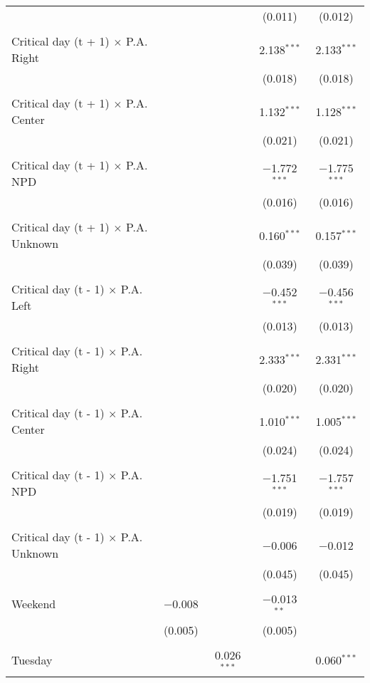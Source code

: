 \documentclass[
]{article}
\begin{document}
\begin{table}[!htbp]
{\begin{tabular}{@{\extracolsep{5pt}}lcccc}
  &  &  & (0.011) & (0.012) \\ 
  & & & & \\ 
 Critical day (t + 1) $\times$ P.A. Right &  &  & 2.138$^{***}$ & 2.133$^{***}$ \\ 
  &  &  & (0.018) & (0.018) \\ 
  & & & & \\ 
 Critical day (t + 1) $\times$ P.A. Center &  &  & 1.132$^{***}$ & 1.128$^{***}$ \\ 
  &  &  & (0.021) & (0.021) \\ 
  & & & & \\ 
 Critical day (t + 1) $\times$ P.A. NPD &  &  & $-$1.772$^{***}$ & $-$1.775$^{***}$ \\ 
  &  &  & (0.016) & (0.016) \\ 
  & & & & \\ 
 Critical day (t + 1) $\times$ P.A. Unknown &  &  & 0.160$^{***}$ & 0.157$^{***}$ \\ 
  &  &  & (0.039) & (0.039) \\ 
  & & & & \\ 
 Critical day (t - 1) $\times$ P.A. Left &  &  & $-$0.452$^{***}$ & $-$0.456$^{***}$ \\ 
  &  &  & (0.013) & (0.013) \\ 
  & & & & \\ 
 Critical day (t - 1) $\times$ P.A. Right &  &  & 2.333$^{***}$ & 2.331$^{***}$ \\ 
  &  &  & (0.020) & (0.020) \\ 
  & & & & \\ 
 Critical day (t - 1) $\times$ P.A. Center &  &  & 1.010$^{***}$ & 1.005$^{***}$ \\ 
  &  &  & (0.024) & (0.024) \\ 
  & & & & \\ 
 Critical day (t - 1) $\times$ P.A. NPD &  &  & $-$1.751$^{***}$ & $-$1.757$^{***}$ \\ 
  &  &  & (0.019) & (0.019) \\ 
  & & & & \\ 
 Critical day (t - 1) $\times$ P.A. Unknown &  &  & $-$0.006 & $-$0.012 \\ 
  &  &  & (0.045) & (0.045) \\ 
  & & & & \\ 
 Weekend & $-$0.008 &  & $-$0.013$^{**}$ &  \\ 
  & (0.005) &  & (0.005) &  \\ 
  & & & & \\ 
 Tuesday &  & 0.026$^{***}$ &  & 0.060$^{***}$ \\ 

\end{tabular}}
\end{table}
\end{document}
